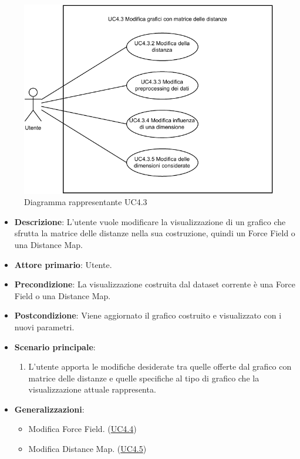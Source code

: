 \begin{figure}[h]
    \centering
    \includegraphics[width=0.8  \textwidth]{componenti/casi-duso/diagrammi/UC4_3.pdf}
    \caption{Diagramma rappresentante UC4.3}
    \label{fig:UC4.3}
\end{figure}

\begin{itemize}
    \item \textbf{Descrizione}: L’utente vuole modificare la visualizzazione di un grafico che sfrutta la matrice delle distanze
                                nella sua costruzione, quindi un Force Field o una Distance Map.
    \item \textbf{Attore primario}: Utente.
    \item \textbf{Precondizione}: La visualizzazione costruita dal dataset corrente è una Force Field o una Distance Map.
    \item \textbf{Postcondizione}: Viene aggiornato il grafico costruito e visualizzato con i nuovi parametri.
    \item \textbf{Scenario principale}:
    \begin{enumerate}
        \item   L’utente apporta le modifiche desiderate tra quelle offerte dal grafico con matrice
                delle distanze e quelle specifiche al tipo di grafico che la visualizzazione attuale rappresenta.
    \end{enumerate}
    \item \textbf{Generalizzazioni}:
    \begin{itemize}
        \item Modifica Force Field. (\hyperref[ssub:uc4.4]{UC4.4})
        \item Modifica Distance Map. (\hyperref[ssub:uc4.5]{UC4.5}) 
    \end{itemize}
\end{itemize}

